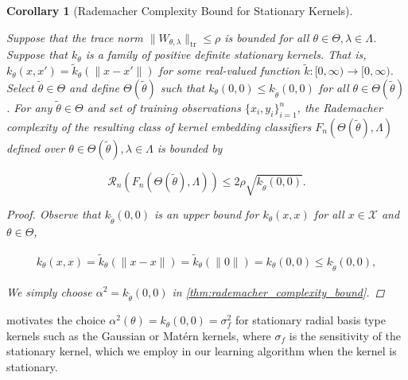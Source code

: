 \documentclass{article}
\newtheorem{corollary}[theorem]{Corollary}
\numberwithin{equation}{section}
\numberwithin{table}{section}
\numberwithin{algorithm}{section}
\begin{document}
		\begin{corollary}[Rademacher Complexity Bound for Stationary Kernels]
		\label{thm:rademacher_complexity_stationary_kernels_bound}
	
			Suppose that the trace norm $\| W_{\theta, \lambda} \|_{\mathrm{tr}} \leq \rho$ is bounded for all $\theta \in \Theta, \lambda \in \Lambda$. Suppose that $k_{\theta}$ is a family of positive definite stationary kernels. That is, $k_{\theta} (x, x') = \tilde{k}_{\theta}( \| x - x' \| )$ for some real-valued function $\tilde{k} : [0, \infty) \to [0, \infty)$. Select $\tilde{\theta} \in \Theta$ and define $\Theta(\tilde{\theta})$ such that $k_{\theta}(0, 0) \leq k_{\tilde{\theta}}(0, 0)$ for all $\theta \in \Theta(\tilde{\theta})$. For any $\tilde{\theta} \in \Theta$ and set of training observations $\{x_{i}, y_{i}\}_{i = 1}^{n}$, the Rademacher complexity of the resulting class of kernel embedding classifiers $F_{n}(\Theta(\tilde{\theta}), \Lambda)$ defined over $\theta \in \Theta(\tilde{\theta}), \lambda \in \Lambda$ is bounded by
		
			\begin{equation}
				\mathcal{R}_{n}(F_{n}(\Theta(\tilde{\theta}), \Lambda)) \leq 2 \rho \sqrt{k_{\tilde{\theta}}(0, 0)}.
			\end{equation}
			
			\begin{proof}
				
				Observe that $k_{\tilde{\theta}}(0, 0)$ is an upper bound for $k_{\theta}(x, x)$ for all $x \in \mathcal{X}$ and $\theta \in \Theta$,
				
				\begin{equation}
					\begin{aligned}
						k_{\theta}(x, x) = \tilde{k}_{\theta}( \| x - x \| ) = \tilde{k}_{\theta}( \| 0 \| ) = k_{\theta}(0, 0) \leq k_{\tilde{\theta}}(0, 0),
					\end{aligned}
				\end{equation}
				
				We simply choose $\alpha^{2} = k_{\tilde{\theta}}(0, 0)$ in \cref{thm:rademacher_complexity_bound}.
			\end{proof}
		
		\end{corollary}
	
		 motivates the choice $\alpha^{2}(\theta) = k_{\theta}(0, 0) = \sigma_{f}^{2}$ for stationary radial basis type kernels such as the Gaussian or Mat\'{e}rn kernels, where $\sigma_{f}$ is the sensitivity \citep{rasmussen2006gaussian} of the stationary kernel, which we employ in our learning algorithm when the kernel is stationary.
\end{document}
